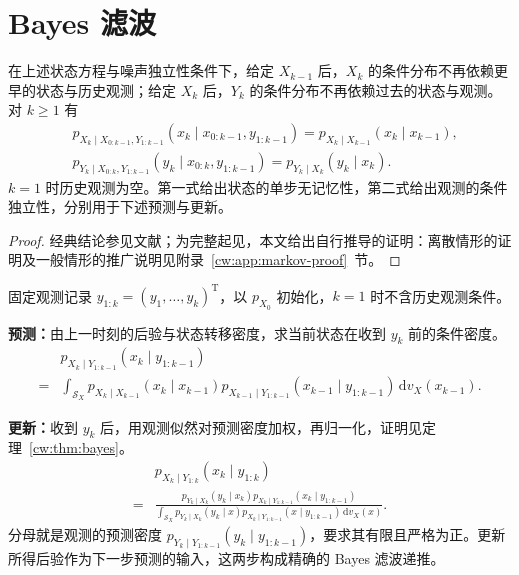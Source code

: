\section{Bayes 滤波}\label{cw:sec:bayes}

\begin{lemma}[无记忆性]\label{cw:lem:markov}
在上述状态方程与噪声独立性条件下，给定 $X_{k-1}$ 后，$X_k$ 的条件分布不再依赖更早的状态与历史观测；给定 $X_k$ 后，$Y_k$ 的条件分布不再依赖过去的状态与观测。对 $k\geq1$ 有
\begin{equation}\label{cw:eq:2}
\begin{aligned}
&p_{X_k\mid X_{0:k-1},Y_{1:k-1}}(x_k\mid x_{0:k-1},y_{1:k-1})
=p_{X_k\mid X_{k-1}}(x_k\mid x_{k-1}),\\
&p_{Y_k\mid X_{0:k},Y_{1:k-1}}(y_k\mid x_{0:k},y_{1:k-1})
=p_{Y_k\mid X_k}(y_k\mid x_k).
\end{aligned}
\end{equation}
$k=1$ 时历史观测为空。第一式给出状态的单步无记忆性，第二式给出观测的条件独立性，分别用于下述预测与更新。

\end{lemma}
\begin{proof}
经典结论参见文献\cite{sarkka2013bayesian,cappe2005inference}；为完整起见，本文给出自行推导的证明：离散情形的证明及一般情形的推广说明见附录~\ref{cw:app:markov-proof}~节。
\end{proof}

固定观测记录 $y_{1:k}=(y_1,\dots,y_k)^{\mathrm{T}}$，以 $p_{X_0}$ 初始化，$k=1$ 时不含历史观测条件。

\textbf{预测：}由上一时刻的后验与状态转移密度，求当前状态在收到 $y_k$ 前的条件密度。
\begin{equation}\label{cw:eq:3}
\begin{aligned}
&p_{X_k\mid Y_{1:k-1}}(x_k\mid y_{1:k-1})\\
= &\int_{\mathcal{S}_X}p_{X_k\mid X_{k-1}}(x_k\mid x_{k-1})p_{X_{k-1}\mid Y_{1:k-1}}(x_{k-1}\mid y_{1:k-1})\,\mathrm{d}v_X(x_{k-1}).
\end{aligned}
\end{equation}

\textbf{更新：}收到 $y_k$ 后，用观测似然对预测密度加权，再归一化，证明见定理~\ref{cw:thm:bayes}。
\begin{equation}\label{cw:eq:4}
\begin{aligned}
&p_{X_k\mid Y_{1:k}}(x_k\mid y_{1:k})\\
= &\frac{p_{Y_k\mid X_k}(y_k\mid x_k)p_{X_k\mid Y_{1:k-1}}(x_k\mid y_{1:k-1})}
{\displaystyle\int_{\mathcal{S}_X}p_{Y_k\mid X_k}(y_k\mid x)p_{X_k\mid Y_{1:k-1}}(x\mid y_{1:k-1})\,\mathrm{d}v_X(x)}.
\end{aligned}
\end{equation}
分母就是观测的预测密度 $p_{Y_k\mid Y_{1:k-1}}(y_k\mid y_{1:k-1})$，要求其有限且严格为正。更新所得后验作为下一步预测的输入，这两步构成精确的 Bayes 滤波递推。
